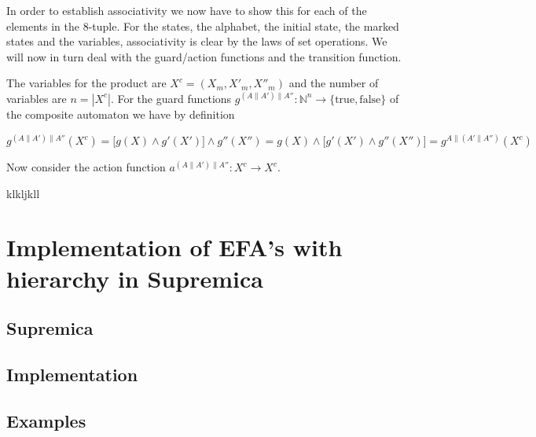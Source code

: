 \documentclass{article}
\begin{document}
\noindent In order to establish associativity we now have to show
this for each of the elements in the 8-tuple. For the states, the
alphabet, the initial state, the marked states and the variables,
associativity is clear by the laws of set operations. We will now
in turn deal with the guard/action functions and the transition
function.

The variables for the product are $X^c=(X_m, X'_m , X''_m)$ and
the number of variables are $n=|X^c|$. For the guard functions
$g^{(A\|A')\|A''} : {\mathbb{N}}^{n} \rightarrow \{\mathrm{true},
\mathrm{false}\}$ of the composite automaton we have by definition

\begin{equation}
  g^{(A\|A')\|A''}(X^c) = \big[g(X) \wedge g'(X') \big] \wedge g''(X'') = g(X) \wedge \big[g'(X') \wedge g''(X'')] = g^{A\|(A'\|A'')}(X^c)
\end{equation}

\noindent Now consider the action function $a^{(A\|A')\|A''} : X^c
\rightarrow X^c$.

klkljkll

\section{Implementation of EFA's with hierarchy in Supremica}

\subsection{Supremica}

\subsection{Implementation}\label{Implementation}
\subsection{Examples}
\end{document}
